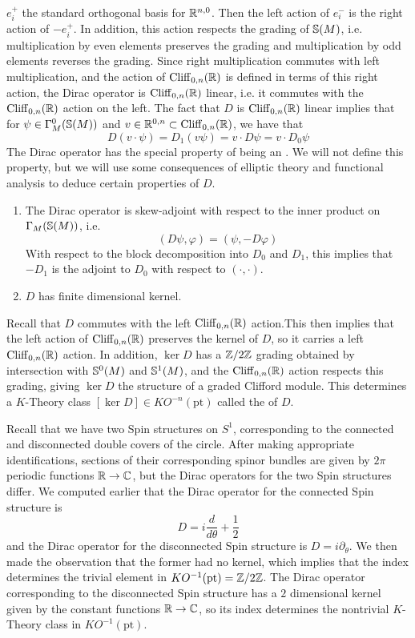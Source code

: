 $e_i^+$ the standard orthogonal basis for $\R^{n,0}$. Then the left action of
$e_i^-$ is the right action of $-e_i^+$. In addition, this action respects
the grading of $\S(M)$, i.e. multiplication by even elements preserves the grading
and multiplication by odd elements reverses the grading. Since right
multiplication commutes with left multiplication, and the action of
$\Cliff_{0,n}(\R)$ is defined in terms of this right action, the Dirac operator is
$\Cliff_{0,n}(\R)$ linear, i.e. it commutes with the $\Cliff_{0,n}(\R)$ action on the
left. The fact that $D$ is $\Cliff_{0,n}(\R)$ linear implies that for
$\psi \in \Gamma^0_M(\S(M))$ and $v \in \R^{0,n} \subset \Cliff_{0,n}(\R)$, we have that
\[
D(v\cdot\psi) = D_1(v\psi) = v\cdot D\psi = v \cdot D_0\psi
\]
The Dirac operator has the special property of being an
. We will not define this property, but we will use some
consequences of elliptic theory and functional analysis to deduce
certain properties of $D$.
\begin{enumerate}
  \item The Dirac operator is skew-adjoint with respect to the inner product on
  $\Gamma_M(\S(M))$, i.e.
  \[
  (D\psi,\varphi) = (\psi, -D\varphi)
  \]
  With respect to the block decomposition into $D_0$ and $D_1$, this implies that
  $-D_1$ is the adjoint to $D_0$ with respect to $(\cdot,\cdot)$.
  \item $D$ has finite dimensional kernel.
\end{enumerate}
%
Recall that $D$ commutes with the left $\Cliff_{0,n}(\R)$ action.This then implies that
the left action of $\Cliff_{0,n}(\R)$ preserves the kernel of $D$, so it carries
a left $\Cliff_{0,n}(\R)$ action. In addition, $\ker D$ has a $\Z/2\Z$ grading obtained
by intersection with $\S^0(M)$ and $\S^1(M)$, and the $\Cliff_{0,n}(\R)$ action
respects this grading, giving $\ker D$ the structure of a graded Clifford module.
This determines a $K$-Theory class $[\ker D] \in KO^{-n}(\mathrm{pt})$ called
the  of $D$.
%
\begin{exmp}
Recall that we have two Spin structures on $S^1$, corresponding to the connected
and disconnected double covers of the circle. After making appropriate identifications,
sections of their corresponding spinor bundles are given by $2\pi$ periodic functions
$\R \to \C$, but the Dirac operators for the two Spin structures differ. We computed
earlier that the Dirac operator for the connected Spin structure is
\[
D = i\frac{d}{d\theta} + \frac{1}{2}
\]
and the Dirac operator for the disconnected Spin structure is $D = i\partial_\theta$.
We then made the observation that the former had no kernel, which implies that
the index determines the trivial element in $KO^{-1}(\mathrm{pt}) = \Z/2\Z$.
The Dirac operator corresponding to the disconnected Spin structure has a
$2$ dimensional kernel given by the constant functions $\R \to \C$, so its
index determines the nontrivial $K$-Theory class in $KO^{-1}(\mathrm{pt})$.
\end{exmp}
